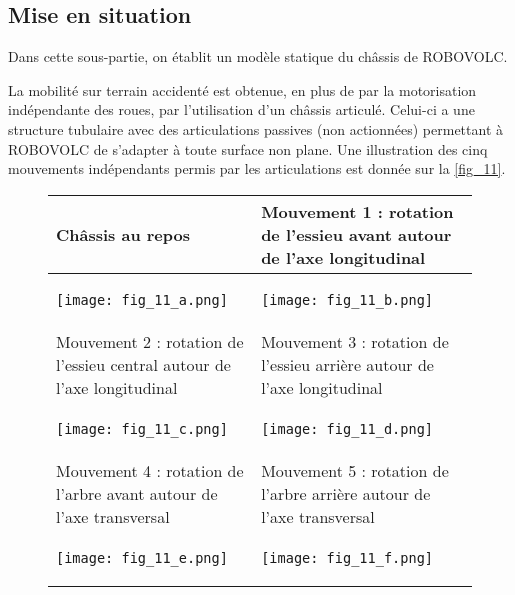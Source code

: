 \begin{multicols}{2}
\section*{Mise en situation}





\begin{obj}
Dans cette sous-partie, on établit un modèle statique du châssis de ROBOVOLC.
\end{obj}

La mobilité sur terrain accidenté est obtenue, en plus de par la motorisation indépendante des
roues, par l'utilisation d'un châssis articulé. Celui-ci a une structure tubulaire avec des articulations
passives (non actionnées) permettant à ROBOVOLC de s'adapter à toute surface non plane. Une
illustration des cinq mouvements indépendants permis par les articulations est donnée sur la
\autoref{fig_11}.

\begin{figure}[H]
\centering
\begin{tabular}{|p{.45\linewidth}|p{.45\linewidth}|}
\hline
Châssis au repos & Mouvement 1 : rotation de l'essieu avant
autour de l'axe longitudinal  \\ \hline
\begin{center}
\texttt{[image: fig\_11\_a.png]}
\end{center}
&
\begin{center}
\texttt{[image: fig\_11\_b.png]}
\end{center}
\\ \hline
Mouvement 2 :
rotation de l'essieu central
autour de l'axe longitudinal & Mouvement 3 :
rotation de l'essieu arrière
autour de l'axe longitudinal  \\ \hline
\begin{center}
\texttt{[image: fig\_11\_c.png]}
\end{center} 
& 
\begin{center}
\texttt{[image: fig\_11\_d.png]}
\end{center} \\ \hline
Mouvement 4 :
rotation de l'arbre avant
autour de l'axe transversal &
Mouvement 5 :
rotation de l'arbre arrière
autour de l'axe transversal \\ \hline
\begin{center}
\texttt{[image: fig\_11\_e.png]}
\end{center}
&
\begin{center}
\texttt{[image: fig\_11\_f.png]}
\end{center} \\ \hline
\end{tabular}


\end{figure}
\end{multicols}
